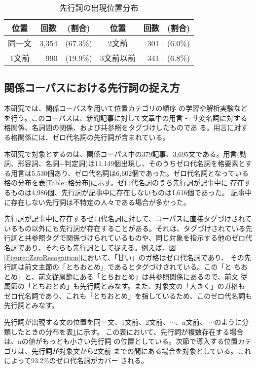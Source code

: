 \documentclass{nlp}
\begin{document}
\begin{table}[t]
 \begin{center}
  \caption{先行詞の出現位置分布}
  \label{Table::出現位置分布}
  \begin{tabular}{c|r@{ }r||c|r@{ }r}\hline
   位置 & \multicolumn{1}{c}{回数} & \multicolumn{1}{c||}{(割合)} &位置
   & 回数 & \multicolumn{1}{c}{(割合)} \\ \hline
   同一文 & 3,354 & (67.3\%) & 2文前     & 301 & (6.0\%) \\
   1文前  &   990 & (19.9\%) & 3文前以前 & 341 & (6.8\%) \\ \hline
  \end{tabular}
 \end{center}
\end{table}


\subsection{関係コーパスにおける先行詞の捉え方}

本研究では、関係コーパス\cite{Kawahara2002ec}を用いて位置カテゴリの順序
の学習や解析実験などを行う。このコーパスは、新聞記事に対して文章中の用言・
サ変名詞に対する格関係、名詞間の関係、および共参照をタグづけしたものであ
る。用言に対する格関係には、ゼロ代名詞の先行詞が含まれている。

本研究で対象とするのは、関係コーパス中の379記事、3,695文である。用言(動
詞、形容詞、名詞+判定詞)は11,149個出現し、そのうちゼロ代名詞を格要素とす
る用言は5,530個あり、ゼロ代名詞は6,602個であった。ゼロ代名詞となっている
格の分布を表\ref{Table::格分布}に示す。ゼロ代名詞のうち先行詞が記事中に
存在するものは4,986個、先行詞が記事中に存在しないものは1,616個であった。
記事中に存在しない先行詞は不特定の人々である場合が多かった。

先行詞が記事中に存在するゼロ代名詞に対して、コーパスに直接タグづけされて
いるもの以外にも先行詞が存在することがある。それは、タグづけされている先
行詞と共参照タグで関係づけられているものや、同じ対象を指示する他のゼロ代
名詞であり、それらも先行詞として捉える。例えば、図
\ref{Figure::ZeroRecognition}において、「甘い」のガ格はゼロ代名詞であり、
その先行詞は前文主節の「とちおとめ」であるとタグづけされている。この「と
ちおとめ」と、前文従属節にある「とちおとめ」は共参照関係にあるので、前文
従属節の「とちおとめ」も先行詞とみなす。また、対象文の「大きく」のガ格も
ゼロ代名詞であり、これも「とちおとめ」を指しているため、このゼロ代名詞も
先行詞とみなす。

先行詞が出現する文の位置を同一文、1文前、2文前、$\cdots$、n文前、
$\cdots$のように分類したときの分布を表\ref{Table::出現位置分布}に示す。
この表において、先行詞が複数存在する場合は、nの値がもっとも小さい先行詞
の位置としている。次節で導入する位置カテゴリは、先行詞が対象文から2文前
までの間にある場合を対象としている。これによって93.2\%のゼロ代名詞がカバー
される。
\end{document}
